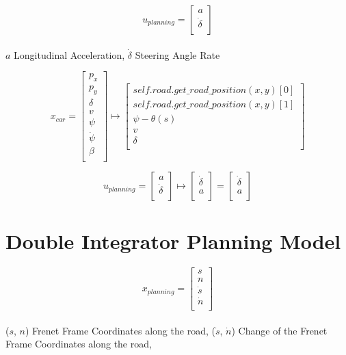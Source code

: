 \[
	u_{planning} = \begin{bmatrix}
		a            \\
		\dot{\delta} \\
	\end{bmatrix}
\]
\\
$a$ Longitudinal Acceleration, $\dot{\delta}$ Steering Angle Rate

\[
	x_{car} = \begin{bmatrix}
		p_x        \\
		p_y        \\
		\delta     \\
		v          \\
		\psi       \\
		\dot{\psi} \\
		\beta      \\
	\end{bmatrix} \mapsto \begin{bmatrix}
		self.road.get\_road\_position(x, y)[0] \\
		self.road.get\_road\_position(x, y)[1] \\
		\psi - \theta(s)                       \\
		v                                      \\
		\delta                                 \\
	\end{bmatrix}
\]

\[
	u_{planning} = \begin{bmatrix}
		a            \\
		\dot{\delta} \\
	\end{bmatrix} \mapsto \begin{bmatrix}
		\dot{\delta} \\
		a            \\
	\end{bmatrix} = \begin{bmatrix}
		\dot{\delta} \\
		a            \\
	\end{bmatrix}
\]

\section{Double Integrator Planning Model}

\[
	x_{planning} = \begin{bmatrix}
		s       \\
		n       \\
		\dot{s} \\
		\dot{n} \\
	\end{bmatrix}
\]
\\
($s$, $n$) Frenet Frame Coordinates along the road, ($\dot{s}$, $\dot{n}$) Change of the Frenet Frame Coordinates along the road,

